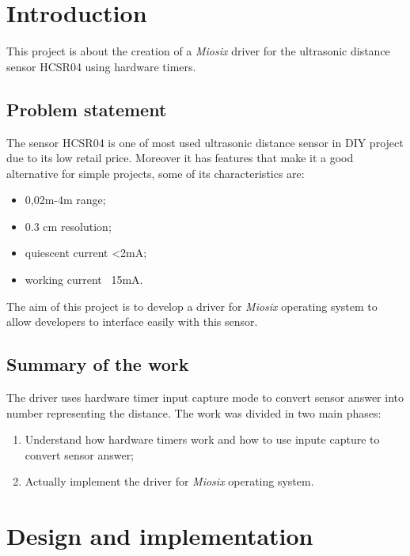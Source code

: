 \section{Introduction}
This project is about the creation of a \textit{Miosix} driver for the ultrasonic distance sensor HCSR04 using hardware timers. 
\subsection{Problem statement}
The sensor HCSR04 is one of most used ultrasonic distance sensor in DIY project due to its low retail price. Moreover it has features that make it a good alternative for simple projects, some of its characteristics are:
\begin{itemize}
\item 0,02m-4m range;
\item 0.3 cm resolution;
\item quiescent current <2mA;
\item working current ~15mA.
\end{itemize}  
The aim of this project is to develop a driver for \textit{Miosix} operating system to allow developers to interface easily with this sensor.
\subsection{Summary of the work}
The driver uses hardware timer input capture mode to convert sensor answer into number representing the distance. The work was divided in two main phases:
\begin{enumerate}
\item Understand how hardware timers work and how to use inpute capture to convert sensor answer;
\item Actually implement the driver for \textit{Miosix} operating system.
\end{enumerate}

\pagebreak

\section{Design and implementation}
